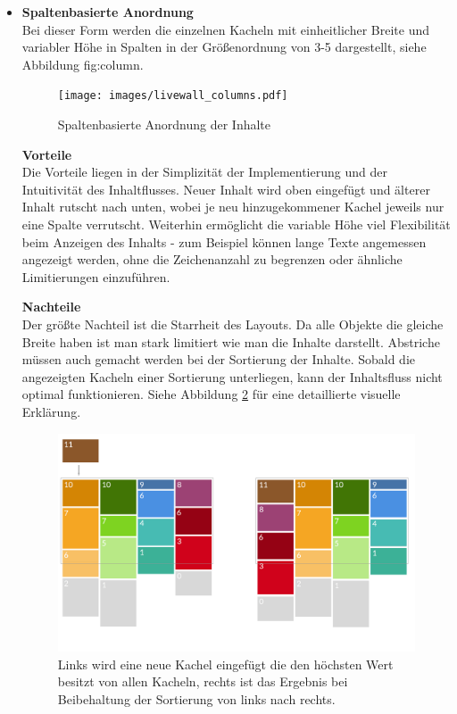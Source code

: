 \documentclass[12pt,twoside]{book}
\begin{document}
\begin{itemize}
  \item \textbf{Spaltenbasierte Anordnung} \\
  Bei dieser Form werden die einzelnen Kacheln mit einheitlicher Breite und variabler Höhe in Spalten in der Größenordnung von 3-5 dargestellt, siehe Abbildung {fig:column}.

  \begin{figure}[htbp]
    \centering
    \texttt{[image: images/livewall\_columns.pdf]}
    \caption{Spaltenbasierte Anordnung der Inhalte}
    \label{fig:column}
  \end{figure}

  \textbf{Vorteile} \\
  Die Vorteile liegen in der Simplizität der Implementierung und der Intuitivität des Inhaltflusses. Neuer Inhalt wird oben eingefügt und älterer Inhalt rutscht nach unten, wobei je neu hinzugekommener Kachel jeweils nur eine Spalte verrutscht.
  Weiterhin ermöglicht die variable Höhe viel Flexibilität beim Anzeigen des Inhalts - zum Beispiel können lange Texte angemessen angezeigt werden, ohne die Zeichenanzahl zu begrenzen oder ähnliche Limitierungen einzuführen.

  \textbf{Nachteile}\\
  Der größte Nachteil ist die Starrheit des Layouts. Da alle Objekte die gleiche Breite haben ist man stark limitiert wie man die Inhalte darstellt. Abstriche müssen auch gemacht werden bei der Sortierung der Inhalte. Sobald die angezeigten Kacheln einer Sortierung unterliegen, kann der Inhaltsfluss nicht optimal funktionieren. Siehe Abbildung \ref{fig:livewall_sort} für eine detaillierte visuelle Erklärung.

  \begin{figure}[htbp]
    \centering
    \includegraphics[width=1.0\textwidth]{images/livewall_sort.png}
    \caption{Links wird eine neue Kachel eingefügt die den höchsten Wert besitzt von allen Kacheln, rechts ist das Ergebnis bei Beibehaltung der Sortierung von links nach rechts.}
    \label{fig:livewall_sort}
  \end{figure}


\end{itemize}
\end{document}
